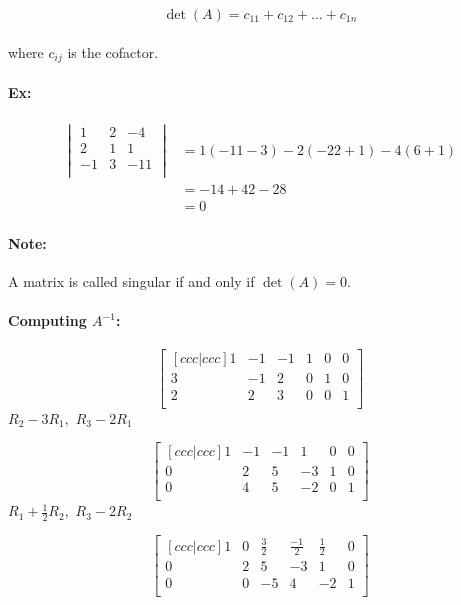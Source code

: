 \documentclass{article}
\begin{document}
\[
    \det(A) = c_{11} + c_{12} + \ldots + c_{1n} 
\]
\paragraph{}where $c_{ij}$ is the cofactor.
\paragraph{Ex:}
\begin{align*}
  \begin{vmatrix}
      1 & 2 & -4\\
      2 & 1 & 1\\
      -1 & 3 & -11\\
  \end{vmatrix} 
   &=
   1(-11 - 3) - 2(-22 + 1) -4(6 + 1)\\
   &= -14 + 42 - 28 \\
   &= 0
\end{align*}
\paragraph{Note:} A matrix is called singular if and only if $\det(A) = 0$.

\paragraph{Computing $A^{-1}$:}

\makeatletter
\renewcommand*\env@matrix[1][*\c@MaxMatrixCols c]{%
  \hskip -\arraycolsep
  \let\@ifnextchar\new@ifnextchar
  \array{#1}}
\makeatother

\[
\begin{bmatrix}[ccc|ccc]
    1& -1 & -1 & 1 & 0 & 0\\
    3 & -1 & 2 & 0 & 1 & 0\\
    2 & 2 & 3 & 0 & 0 & 1\\
  \end{bmatrix} 
\]
$R_2 - 3R_1,$
$R_3 - 2R_1$


\[
\begin{bmatrix}[ccc|ccc]
    1& -1 & -1 & 1 & 0 & 0\\
    0 & 2 & 5 & -3 & 1 & 0\\
    0 & 4 & 5 & -2 & 0 & 1\\
  \end{bmatrix} 
\]
$R_1 + \frac{1}{2}R_2,$
$R_3 - 2R_2$

\[
\begin{bmatrix}[ccc|ccc]
    1& 0 & \frac{3}{2} & \frac{-1}{2} & \frac{1}{2} & 0\\
    0 & 2 & 5 & -3 & 1 & 0\\
    0 & 0 & -5 & 4 & -2 & 1\\
  \end{bmatrix} 
\]
\end{document}
